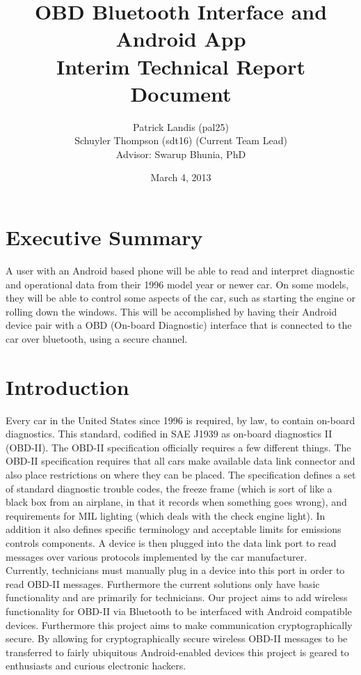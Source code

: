 \documentclass[12pt,letterpaper]{article}
\title{
\textbf{\LARGE OBD Bluetooth Interface and Android App} \\
\Large Interim Technical Report Document
}
\author{
\normalsize Patrick Landis (pal25) \\
\normalsize Schuyler Thompson (sdt16) (Current Team Lead) \\
\normalsize Advisor: Swarup Bhunia, PhD
}
\date{\normalsize March 4, 2013}
\begin{document}
\maketitle
\newpage

\section*{Executive Summary}
A user with an Android based phone will be able to read and interpret diagnostic and operational data from their 1996 model year or newer car. On some models, they will be able to control some aspects of the car, such as starting the engine or rolling down the windows. This will be accomplished by having their Android device pair with a OBD (On-board Diagnostic) interface that is connected to the car over bluetooth, using a secure channel. 

\newpage

\section{Introduction}
Every car in the United States since 1996 is required, by law, to contain on-board diagnostics. This standard, codified in SAE J1939 as on-board diagnostics II (OBD-II). The OBD-II specification officially requires a few different things. The OBD-II specification requires that all cars make available data link connector and also place restrictions on where they can be placed. The specification defines a set of standard diagnostic trouble codes, the freeze frame (which is sort of like a black box from an airplane, in that it records when something goes wrong), and requirements for MIL lighting (which deals with the check engine light). In addition it also defines specific terminology and acceptable limits for emissions controls components. A device is then plugged into the data link port to read messages over various protocols implemented by the car manufacturer. \\

Currently, technicians must manually plug in a device into this port in order to read OBD-II messages. Furthermore the current solutions only have basic functionality and are primarily for technicians. Our project aims to add wireless functionality for OBD-II via Bluetooth to be interfaced with Android compatible devices. Furthermore this project aims to make communication cryptographically secure. By allowing for cryptographically secure wireless OBD-II messages to be transferred to fairly ubiquitous Android-enabled devices this project is geared to enthusiasts and curious electronic hackers.
\end{document}
